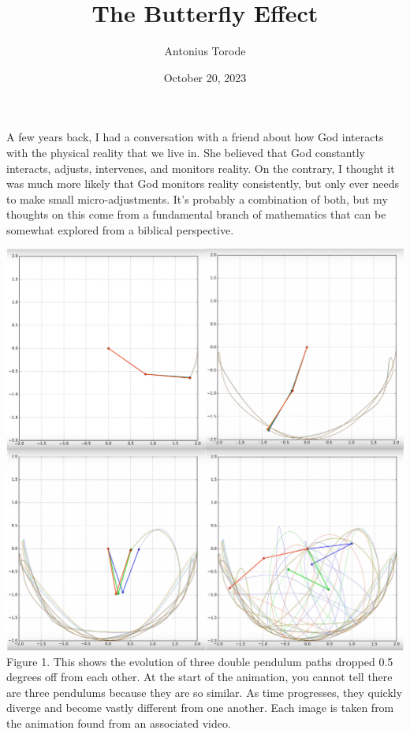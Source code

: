 \documentclass[10pt]{article}
\title{The Butterfly Effect}
\author{Antonius Torode}
\date{October 20, 2023}
\newenvironment{Figure}
{\par\medskip\noindent\minipage{\linewidth}}
{\endminipage\par\medskip}
\begin{document}
\maketitle
\thispagestyle{fancy}

\begin{multicols}{2}

A few years back, I had a conversation with a friend about how God interacts with the physical reality that we live in. She believed that God constantly interacts, adjusts, intervenes, and monitors reality. On the contrary, I thought it was much more likely that God monitors reality consistently, but only ever needs to make small micro-adjustments. It’s probably a combination of both, but my thoughts on this come from a fundamental branch of mathematics that can be somewhat explored from a biblical perspective.

\begin{Figure}
\centering
\includegraphics[width=\textwidth]{bp.jpg}
{\footnotesize Figure 1. This shows the evolution of three double pendulum paths dropped 0.5 degrees off from each other. At the start of the animation, you cannot tell there are three pendulums because they are so similar. As time progresses, they quickly diverge and become vastly different from one another. Each image is taken from the animation found from an associated video\cite{DP animation}.}
\end{Figure}


\end{multicols}
\end{document}
